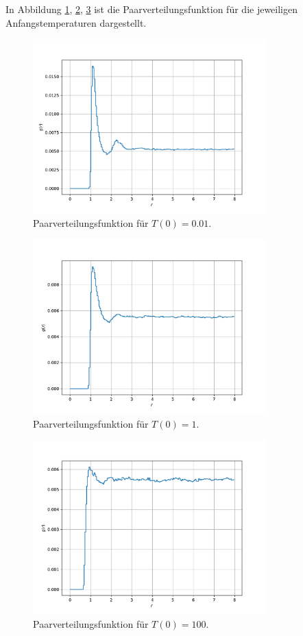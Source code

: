 In Abbildung \ref{fig:g_001}, \ref{fig:g_1}, \ref{fig:g_100} ist die Paarverteilungsfunktion für die jeweiligen Anfangstemperaturen dargestellt.
\begin{figure}
    \centering
    \includegraphics[width=0.8\textwidth]{content/plots/g_c)_T001.pdf}
    \caption{Paarverteilungsfunktion für $T(0)=0.01$.}
    \label{fig:g_001}
\end{figure}
\begin{figure}
    \centering
    \includegraphics[width=0.8\textwidth]{content/plots/g_c)_T1.pdf}
    \caption{Paarverteilungsfunktion für $T(0)=1$.}
    \label{fig:g_1}
\end{figure}
\begin{figure}
    \centering
    \includegraphics[width=0.8\textwidth]{content/plots/g_c)_T100.pdf}
    \caption{Paarverteilungsfunktion für $T(0)=100$.}
    \label{fig:g_100}
\end{figure}
